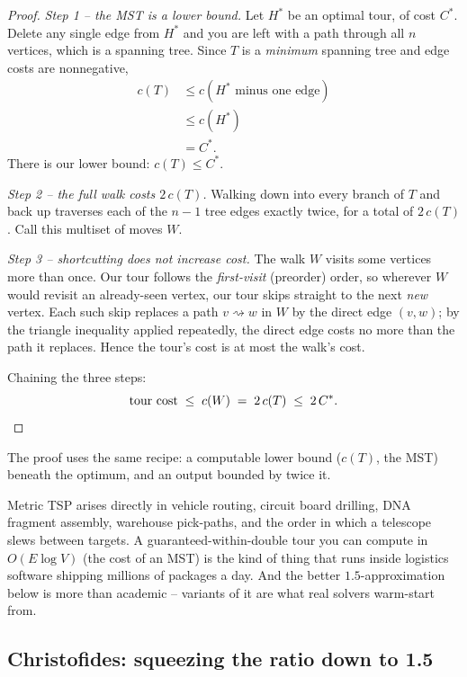 \begin{proof}
\emph{Step 1 -- the MST is a lower bound.} Let $H^{*}$ be an optimal tour, of
cost $C^{*}$. Delete any single edge from $H^{*}$ and you are left with a path
through all $n$ vertices, which is a spanning tree. Since $T$ is a
\emph{minimum} spanning tree and edge costs are nonnegative,
\begin{align*}
c(T) &\le c(H^{*} \text{ minus one edge}) \\
&\le c(H^{*}) \\
&= C^{*}.
\end{align*}
There is our lower bound: $c(T) \le C^{*}$.

\emph{Step 2 -- the full walk costs $2\,c(T)$.} Walking down into every branch
of $T$ and back up traverses each of the $n-1$ tree edges exactly twice, for a
total of $2\,c(T)$. Call this multiset of moves $W$.

\emph{Step 3 -- shortcutting does not increase cost.} The walk $W$ visits some
vertices more than once. Our tour follows the \emph{first-visit} (preorder)
order, so wherever $W$ would revisit an already-seen vertex, our tour skips
straight to the next \emph{new} vertex. Each such skip replaces a path
$v \rightsquigarrow w$ in $W$ by the direct edge $(v,w)$; by the triangle
inequality applied repeatedly, the direct edge costs no more than the path it
replaces. Hence the tour's cost is at most the walk's cost.

Chaining the three steps:
\[
\text{tour cost} \;\le\; c(W) \;=\; 2\,c(T) \;\le\; 2\,C^{*}. \qedhere
\]
\end{proof}

The proof uses the same recipe: a computable lower bound ($c(T)$, the MST) beneath
the optimum, and an output bounded by twice it.

\begin{aestheticbox}
Metric TSP arises directly in vehicle routing, circuit
board drilling, DNA fragment assembly, warehouse pick-paths, and the order in
which a telescope slews between targets. A guaranteed-within-double tour you
can compute in $O(E\log V)$ (the cost of an MST) is the kind of thing that
runs inside logistics software shipping millions of packages a day.
And the better $1.5$-approximation below is more than academic -- variants of
it are what real solvers warm-start from.
\end{aestheticbox}

\subsection{Christofides: squeezing the ratio down to 1.5}

